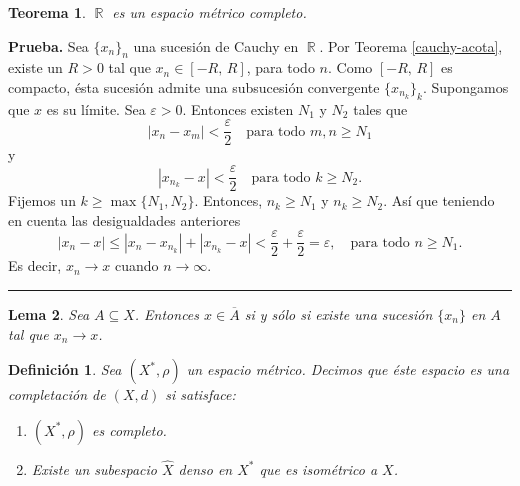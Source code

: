\documentclass[x11names, 12pt]{book}
\newtheorem{definicion}{Definición}
\newtheorem{teorema}{Teorema}
\newtheorem{lema}[teorema]{Lema}
\newenvironment{prueba}[1][Prueba]{\noindent\textbf{#1.} }{\ \rule{0.5em}{0.5em}}
\DeclareMathOperator{\R}{\mathbb{R}}
\begin{document}
\begin{teorema}\label{R-completo}
$\R$ es un espacio métrico completo.
\end{teorema}
\begin{prueba}
Sea $\{x_n \}_n$ una sucesión de Cauchy en $\R$. Por Teorema \ref{cauchy-acota}, existe un $R>0$ tal que $x_n \in [-R, \, R]$, para todo $n$. Como $[-R, \, R]$ es compacto, ésta sucesión admite una  subsucesión convergente $\{x_{n_k}\}_k$. Supongamos que $x$ es su límite. Sea $\varepsilon >0$. Entonces existen  $N_1$ y $N_2$ tales que
\[ | x_n- x_m|<\frac{\varepsilon}{2} \quad \text{para todo $m,n\geq N_1$}\]
y
\[ | x_{n_k}- x|<\frac{\varepsilon}{2} \quad \text{para todo $k\geq N_2$}.\]
Fijemos un $k\geq \max\{N_1, N_2\}$. Entonces, $n_k\geq N_1$ y $n_k\geq N_2$. Así que teniendo en cuenta las desigualdades anteriores
\[ | x_n- x | \leq | x_n- x_{n_k} |+| x_{n_k}- x | <\frac{\varepsilon}{2}+\frac{\varepsilon}{2}={\varepsilon}, \quad \text{para todo $n \geq N_1$}.\]
Es decir, $x_n \to x$ cuando $n\to \infty .$
\end{prueba}

\begin{lema}\label{claus-suces}
Sea $A\subseteq X$. Entonces $x\in \overline{A}$ si y sólo si existe una sucesión $\{x_n\}$ en $A$ tal que $x_n\to x$.
\end{lema}

\begin{definicion}
Sea $(X^*, \rho)$ un espacio métrico. Decimos que éste espacio es una completación de $(X,d)$ si satisface:
\begin{enumerate}
    \item $(X^*, \rho)$ es completo.
    \item Existe un subespacio $\hat{X}$ denso en $X^*$ que es isométrico a $X$.
\end{enumerate}
\end{definicion}
\end{document}
